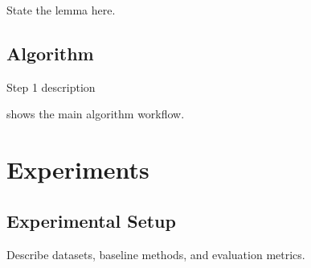 \documentclass[macnew, en]{manuscript}
\begin{document}
\begin{lemma}
    State the lemma here.
\end{lemma}

\subsection{Algorithm}
\label{subsec:algorithm}

\begin{algorithm}[t]
    Step 1 description\\
    \caption{Algorithm Name}
    \label{alg:example}
\end{algorithm}

 shows the main algorithm workflow.

\section{Experiments}
\label{sec:exp}

\subsection{Experimental Setup}
\label{subsec:setup}

Describe datasets, baseline methods, and evaluation metrics.
\end{document}
